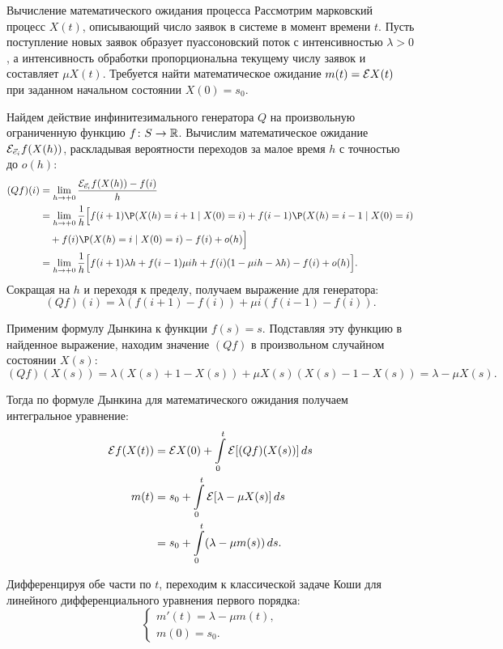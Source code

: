 \begin{example}{Вычисление математического ожидания процесса}
    Рассмотрим марковский процесс $X(t)$, описывающий число заявок в системе в момент времени $t$. Пусть поступление новых заявок образует пуассоновский поток с интенсивностью $\lambda > 0$, а интенсивность обработки пропорциональна текущему числу заявок и составляет $\mu X(t)$. Требуется найти математическое ожидание $m(t) = \mathcal{E} X(t)$ при заданном начальном состоянии $X(0) = s_0$.
\end{example}
\begin{eproof}
    Найдем действие инфинитезимального генератора $Q$ на произвольную ограниченную функцию $f \colon S \to \mathbb{R}$. Вычислим математическое ожидание $\mathcal{E}_{\vec{e}_i} f(X(h))$, раскладывая вероятности переходов за малое время $h$ с точностью до $o(h)$:
    \begin{align*}
        (Qf)(i) &= \lim_{h \to +0} \frac{\E_{\vec{e}_i} f(X(h)) - f(i)}{h} \\
        &= \lim_{h \to +0} \frac{1}{h} \Big[ f(i+1) \P(X(h)=i+1 \mid X(0)=i) + f(i-1) \P(X(h)=i-1 \mid X(0)=i) \\
        &\quad + f(i) \P(X(h)=i \mid X(0)=i) - f(i) + o(h) \Big] \\
        &= \lim_{h \to +0} \frac{1}{h} \Big[ f(i+1) \lambda h + f(i-1) \mu i h + f(i) (1 - \mu i h - \lambda h) - f(i) + o(h) \Big].
    \end{align*}
    Сокращая на $h$ и переходя к пределу, получаем выражение для генератора:
    \[
        (Qf)(i) = \lambda (f(i+1) - f(i)) + \mu i (f(i-1) - f(i)).
    \]
    
    Применим формулу Дынкина к функции $f(s) = s$. Подставляя эту функцию в найденное выражение, находим значение $(Qf)$ в произвольном случайном состоянии $X(s)$:
    \[
        (Qf)(X(s)) = \lambda (X(s) + 1 - X(s)) + \mu X(s) (X(s) - 1 - X(s)) = \lambda - \mu X(s).
    \]
    
    Тогда по формуле Дынкина для математического ожидания получаем интегральное уравнение:
    \begin{align*}
        \mathcal{E} f(X(t)) &= \mathcal{E} X(0) + \int\limits_0^t \mathcal{E} [(Qf)(X(s))] \, ds \\
        m(t) &= s_0 + \int\limits_0^t \mathcal{E} [\lambda - \mu X(s)] \, ds \\
        &= s_0 + \int\limits_0^t (\lambda - \mu m(s)) \, ds.
    \end{align*}
    
    Дифференцируя обе части по $t$, переходим к классической задаче Коши для линейного дифференциального уравнения первого порядка:
    \[
        \begin{cases}
            m'(t) = \lambda - \mu m(t), \\
            m(0) = s_0.
        \end{cases}
    \]


\end{eproof}

